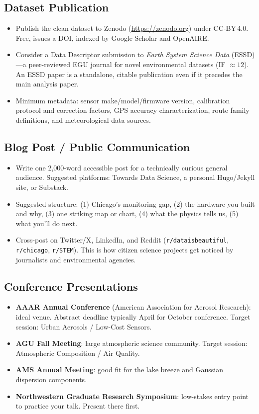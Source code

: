 \documentclass[11pt, letterpaper]{article}
\begin{document}
\subsection{Dataset Publication}
\begin{itemize}
  \item Publish the clean dataset to Zenodo (\url{https://zenodo.org}) under CC-BY\,4.0. Free, issues a DOI, indexed by Google Scholar and OpenAIRE.
  \item Consider a Data Descriptor submission to \textit{Earth System Science Data} (ESSD)---a peer-reviewed EGU journal for novel environmental datasets (IF $\approx 12$). An ESSD paper is a standalone, citable publication even if it precedes the main analysis paper.
  \item Minimum metadata: sensor make/model/firmware version, calibration protocol and correction factors, GPS accuracy characterization, route family definitions, and meteorological data sources.
\end{itemize}

\subsection{Blog Post / Public Communication}
\begin{itemize}
  \item Write one 2{,}000-word accessible post for a technically curious general audience. Suggested platforms: Towards Data Science, a personal Hugo/Jekyll site, or Substack.
  \item Suggested structure: (1) Chicago's monitoring gap, (2) the hardware you built and why, (3) one striking map or chart, (4) what the physics tells us, (5) what you'll do next.
  \item Cross-post on Twitter/X, LinkedIn, and Reddit (\texttt{r/dataisbeautiful}, \texttt{r/chicago}, \texttt{r/STEM}). This is how citizen science projects get noticed by journalists and environmental agencies.
\end{itemize}

\subsection{Conference Presentations}
\begin{itemize}
  \item \textbf{AAAR Annual Conference} (American Association for Aerosol Research): ideal venue. Abstract deadline typically April for October conference. Target session: Urban Aerosols / Low-Cost Sensors.
  \item \textbf{AGU Fall Meeting}: large atmospheric science community. Target session: Atmospheric Composition / Air Quality.
  \item \textbf{AMS Annual Meeting}: good fit for the lake breeze and Gaussian dispersion components.
  \item \textbf{Northwestern Graduate Research Symposium}: low-stakes entry point to practice your talk. Present there first.
\end{itemize}
\end{document}
